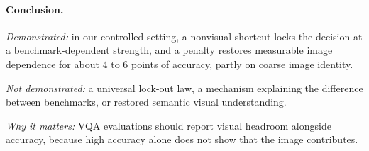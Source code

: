 \paragraph{Conclusion.}
\emph{Demonstrated:} in our controlled setting, a nonvisual shortcut locks the decision at a benchmark-dependent strength, and a penalty restores measurable image dependence for about 4 to 6 points of accuracy, partly on coarse image identity.

\emph{Not demonstrated:} a universal lock-out law, a mechanism explaining the difference between benchmarks, or restored semantic visual understanding.

\emph{Why it matters:} VQA evaluations should report visual headroom alongside accuracy, because high accuracy alone does not show that the image contributes.
